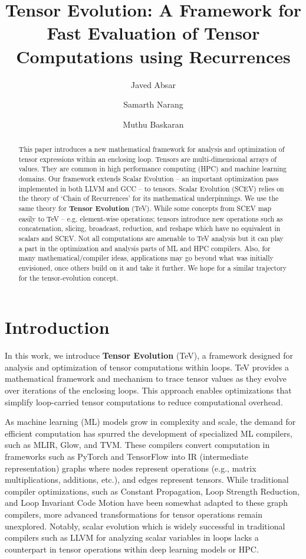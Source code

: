 \documentclass{article}
\title{Tensor Evolution: A Framework for Fast Evaluation of Tensor Computations using Recurrences}
\author[1]{Javed Absar}
\author[2]{Samarth Narang }
\author[3]{Muthu Baskaran }
\affil[1]{Qualcomm Technologies International}
\affil[2]{Qualcomm Technologies, Inc.}
\affil[3]{Qualcomm Technologies, Inc.}
\begin{document}
\maketitle

\begin{abstract}
This paper introduces a new mathematical framework for analysis and optimization of tensor
expressions within an enclosing loop. Tensors are multi-dimensional arrays of values.
They are common in high performance computing (HPC)  and machine learning
\cite{TensorComprehension} domains. Our framework extends Scalar Evolution
\cite{scev_j} -- an important optimization pass implemented in both LLVM and GCC -- to tensors.
Scalar Evolution (SCEV) relies on the theory of `Chain of Recurrences' \cite{Zima} for its
mathematical underpinnings. We use the same theory for \textbf{Tensor Evolution} (TeV).
While some concepts from SCEV map easily to TeV -- e.g. element-wise operations;
tensors introduce new operations \cite{Attention, mlir,TVM,Glow} such as concatenation,
slicing, broadcast, reduction, and reshape which have no equivalent in scalars and SCEV.
Not all computations are amenable to TeV analysis but it can play a part in the optimization
and analysis parts of ML and HPC compilers. Also, for many mathematical/compiler ideas,
applications may go beyond what was initially envisioned, once others build on it and
take it further. We hope for a similar trajectory for the tensor-evolution concept.
\end{abstract}

\section{Introduction}
In this work, we introduce \textbf{Tensor Evolution} (TeV), a framework designed for analysis and optimization
 of tensor computations within loops. TeV provides a mathematical framework and mechanism to trace tensor
  values as they evolve over iterations of the enclosing loops. This approach enables optimizations that
   simplify loop-carried tensor computations to reduce computational overhead.

As machine learning (ML) models grow in complexity and scale, the demand for efficient computation has
spurred the development of specialized ML compilers, such as MLIR\cite{mlir}, Glow\cite{Glow}, and
TVM\cite{TVM}. These compilers convert computation in frameworks such as PyTorch and TensorFlow into
IR (intermediate representation) graphs where nodes represent operations
(e.g., matrix multiplications, additions, etc.), and edges represent tensors.
While traditional compiler optimizations, such as Constant Propagation, Loop Strength Reduction,
and Loop Invariant Code Motion have been somewhat adapted to these graph compilers,
more advanced transformations for tensor operations remain unexplored. Notably,
scalar evolution which is widely successful in traditional compilers such as LLVM for
analyzing scalar variables in loops lacks a counterpart in tensor operations within deep learning models or HPC. 
\end{document}
